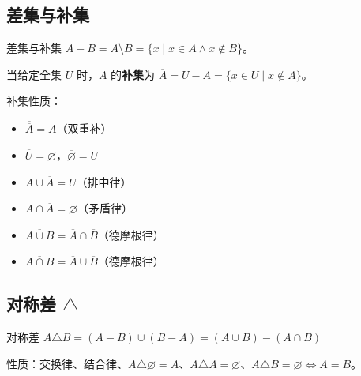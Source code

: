 \subsection{差集与补集}

\begin{mydefinition}{差集与补集}
$A - B = A \setminus B = \{x \mid x \in A \land x \notin B\}$。

当给定全集 $U$ 时，$A$ 的\textbf{补集}为 $\overline{A} = U - A = \{x \in U \mid x \notin A\}$。
\end{mydefinition}

补集性质：
\begin{itemize}
\item $\overline{\overline{A}} = A$（双重补）
\item $\overline{U} = \varnothing$，$\overline{\varnothing} = U$
\item $A \cup \overline{A} = U$（排中律）
\item $A \cap \overline{A} = \varnothing$（矛盾律）
\item $\overline{A \cup B} = \overline{A} \cap \overline{B}$（德摩根律）
\item $\overline{A \cap B} = \overline{A} \cup \overline{B}$（德摩根律）
\end{itemize}

\subsection{对称差 $\triangle$}

\begin{mydefinition}{对称差}
$A \triangle B = (A - B) \cup (B - A) = (A \cup B) - (A \cap B)$
\end{mydefinition}

性质：交换律、结合律、$A \triangle \varnothing = A$、$A \triangle A = \varnothing$、$A \triangle B = \varnothing \iff A = B$。

